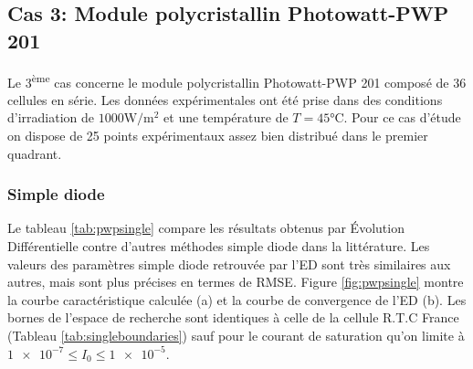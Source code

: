 \subsection{Cas 3: Module polycristallin Photowatt-PWP 201}

Le 3\textsuperscript{ème} cas concerne le module polycristallin Photowatt-PWP 201 composé de 36 cellules en série. Les données expérimentales ont été prise dans des conditions d'irradiation de $1000 \si{\watt\per\square\meter}$ et une température de $T = 45 \si{\celsius}$. Pour ce cas d'étude on dispose de 25 points expérimentaux assez bien distribué dans le premier quadrant.

\subsubsection{Simple diode}
Le tableau \ref{tab:pwpsingle} compare les résultats obtenus par Évolution Différentielle contre d'autres méthodes simple diode dans la littérature. Les valeurs des paramètres simple diode retrouvée par l'ED sont très similaires aux autres, mais sont plus précises en termes de RMSE. Figure \ref{fig:pwpsingle} montre la courbe caractéristique calculée (a) et la courbe de convergence de l'ED (b). Les bornes de l'espace de recherche sont identiques à celle de la cellule R.T.C France (Tableau \ref{tab:singleboundaries}) sauf pour le courant de saturation qu'on limite à $\num{1e-7} \leq I_{0} \leq \num{1e-5}$.
